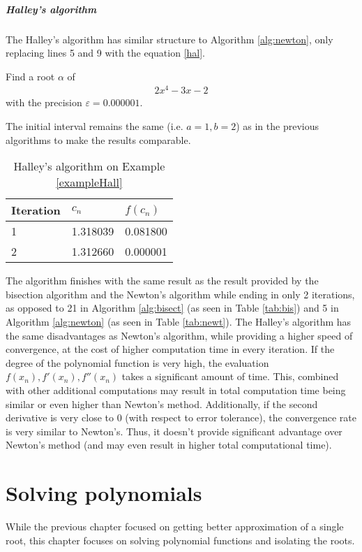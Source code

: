 \documentclass[
  digital, %
  notable,   %
  nolof,     %
  nolot,     %
	draft, %
]{fithesis3}
\begin{document}
\paragraph{Halley's algorithm}
The Halley's algorithm has similar structure to Algorithm \ref{alg:newton}, only replacing lines 5 and 9 with the equation \ref{hal}.
\begin{example}
\label{exampleHall}
Find a root $\alpha$ of 
\begin{align}
      2x^{4} - 3x - 2
\end{align}
with the precision $\varepsilon = 0.000001$.
\end{example}
The initial interval remains the same (i.e. $a=1, b=2$) as in the previous algorithms to make the results comparable.
\FloatBarrier
\begin{table}[H]
  \begin{tabular*}{\textwidth}{lll}
    \toprule
    Iteration & $c_{n}$ & $f(c_{n})$\\
    \midrule
				1 & 1.318039 & 0.081800 \\
				2 & 1.312660 & 0.000001 \\
    \bottomrule
  \end{tabular*}
  \caption{Halley's algorithm on Example \ref{exampleHall}}
  \label{tab:hall}
\end{table}
The algorithm finishes with the same result as the result provided by the bisection algorithm and the Newton's algorithm while ending in only 2 iterations, as opposed to 21 in Algorithm \ref{alg:bisect} (as seen in Table \ref{tab:bis}) and 5 in Algorithm \ref{alg:newton} (as seen in Table \ref{tab:newt}).
The Halley's algorithm has the same disadvantages as Newton's algorithm, while providing a higher speed of convergence, at the cost of higher computation time in every iteration. If the degree of the polynomial function is very high, the evaluation $f(x_{n}), f'(x_{n}), f''(x_{n})$ takes a significant amount of time. This, combined with other additional computations may result in total computation time being similar or even higher than Newton's method. Additionally, if the second derivative is very close to 0 (with respect to error tolerance), the convergence rate is very similar to Newton's. Thus, it doesn't provide significant advantage over Newton's method (and may even result in higher total computational time).

\chapter{Solving polynomials}
While the previous chapter focused on getting better approximation of a single root, this chapter focuses on solving polynomial functions and isolating the roots.
\end{document}
